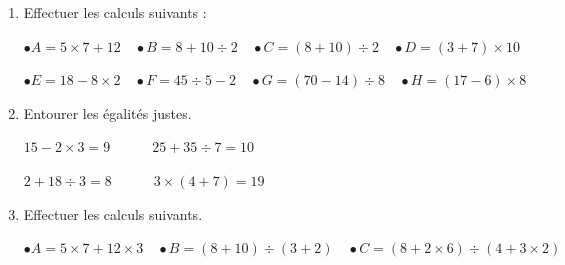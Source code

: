 \documentclass[a4paper]{book}
\begin{document}
    \begin{exercice}
        \begin{enumerate}
            \item Effectuer les calculs suivants :

            \begin{center}
                $\bullet A=5\times7+12 
                \quad \bullet B=8+10\div2 
                \quad \bullet C=(8+10)\div2 
                \quad \bullet D=(3+7)\times 10$
    
                $\bullet E=18-8\times2 
                \quad \bullet F=45\div 5 - 2
                \quad \bullet G=(70-14)\div8
                \quad \bullet H=(17-6)\times 8$
            \end{center}
            
            \item Entourer les égalités justes.

            \begin{center}
                $15-2\times3=9 
                \quad \quad \quad 25+35\div7=10 $
            \end{center}

            \begin{center}
                $2+18\div3=8 
                \quad \quad \quad 3\times(4+7)=19 $
            \end{center}
            
            \item Effectuer les calculs suivants.

            \begin{center}
                $\bullet A=5\times7+12\times3
                \quad \bullet B=(8+10)\div(3+2) 
                \quad \bullet C=(8+2\times6)\div(4+3\times2)$
            \end{center}
            
        \end{enumerate}
    \end{exercice}
\end{document}
